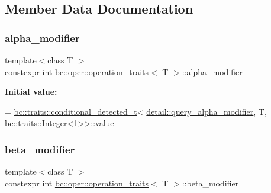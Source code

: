 \subsection{Member Data Documentation}
\mbox{\label{structbc_1_1oper_1_1operation__traits_acb09b3c89cc154e01c8948a1996e1df2}} 
\subsubsection{\texorpdfstring{alpha\+\_\+modifier}{alpha\_modifier}}
{\footnotesize\ttfamily template$<$class T $>$ \\
constexpr int \hyperlink{structbc_1_1oper_1_1operation__traits}{bc\+::oper\+::operation\+\_\+traits}$<$ T $>$\+::alpha\+\_\+modifier\hspace{0.3cm}{\ttfamily [static]}}

{\bfseries Initial value\+:}
\begin{DoxyCode}
= \hyperlink{namespacebc_1_1traits_a1a6d378947ec32acd457890854bcd592}{bc::traits::conditional\_detected\_t}<
            \hyperlink{namespacebc_1_1oper_1_1detail_a5fe5a0f1d0c660f34cb4f975ad4d29bf}{detail::query\_alpha\_modifier}, T, 
      \hyperlink{structbc_1_1traits_1_1Integer}{bc::traits::Integer<1>}>::value
\end{DoxyCode}
\mbox{\label{structbc_1_1oper_1_1operation__traits_a18401bbd284e30d4af842462e5a0e49a}} 
\subsubsection{\texorpdfstring{beta\+\_\+modifier}{beta\_modifier}}
{\footnotesize\ttfamily template$<$class T $>$ \\
constexpr int \hyperlink{structbc_1_1oper_1_1operation__traits}{bc\+::oper\+::operation\+\_\+traits}$<$ T $>$\+::beta\+\_\+modifier\hspace{0.3cm}{\ttfamily [static]}}

